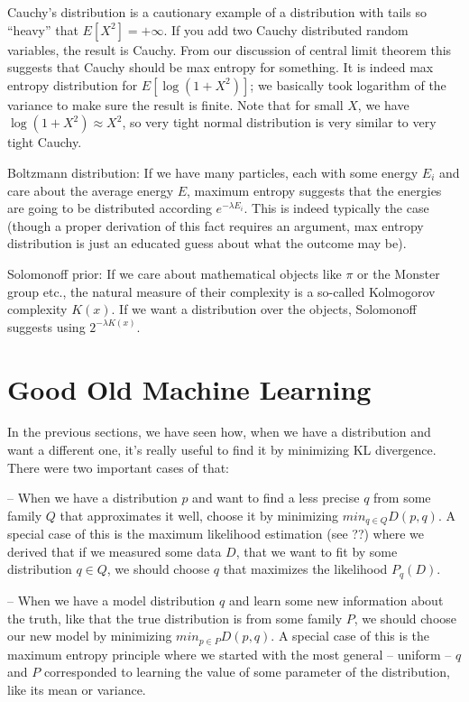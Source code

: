 \documentclass{article}
\begin{document}
Cauchy's distribution is a cautionary example of a distribution with tails so ``heavy'' that $E[X^2] = + \infty$. If you add two Cauchy distributed random variables, the result is Cauchy. From our discussion of central limit theorem this suggests that Cauchy should be max entropy for something. It is indeed max entropy distribution for $E[\log (1 + X^2)]$; we basically took logarithm of the variance to make sure the result is finite. Note that for small $X$, we have $\log (1 + X^2) \approx X^2$, so very tight normal distribution is very similar to very tight Cauchy. 

Boltzmann distribution: If we have many particles, each with some energy $E_i$ and care about the average energy $E$, maximum entropy suggests that the energies are going to be distributed according $e^{-\lambda E_i}$. This is indeed typically the case (though a proper derivation of this fact requires an argument, max entropy distribution is just an educated guess about what the outcome may be). 

Solomonoff prior: If we care about mathematical objects like $\pi$ or the Monster group etc., the natural measure of their complexity is a so-called Kolmogorov complexity $K(x)$. If we want a distribution over the objects, Solomonoff suggests using $2^{-\lambda K(x)}$. 



\section{Good Old Machine Learning}

In the previous sections, we have seen how, when we have a distribution and want a different one, it's really useful to find it by minimizing KL divergence. There were two important cases of that: 

-- When we have a distribution $p$ and want to find a less precise $q$ from some family $Q$ that approximates it well, choose it by minimizing $min_{q \in Q} D(p,q)$. A special case of this is the maximum likelihood estimation (see ??) where we derived that if we measured some data $D$, that we want to fit by some distribution $q \in Q$, we should choose $q$ that maximizes the likelihood $P_q(D)$. 

-- When we have a model distribution $q$ and learn some new information about the truth, like that the true distribution is from some family $P$, we should choose our new model by minimizing $min_{p \in P} D(p,q)$. A special case of this is the maximum entropy principle where we started with the most general -- uniform -- $q$ and $P$ corresponded to learning the value of some parameter of the distribution, like its mean or variance. 
\end{document}
